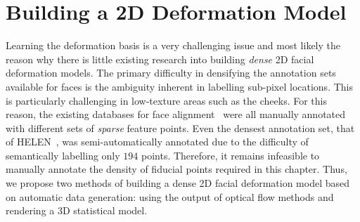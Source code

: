 \section{Building a 2D Deformation Model}\label{sec:face_flow_learning_deformation}
Learning the deformation basis is a very challenging issue and most likely the reason
why there is little existing research into building \textit{dense} 2D facial deformation models.
The primary difficulty in densifying the annotation sets available for faces
is the ambiguity inherent in labelling sub-pixel locations. This is particularly
challenging in low-texture areas such as the cheeks. For this reason, the 
existing databases for face alignment~\cite{sagonas2013300,zhu2012face,%
belhumeur2013localizing,le2012interactive} were all manually annotated with
different sets of \textit{sparse} feature points. 
Even the densest annotation set, that of HELEN~\cite{le2012interactive}, 
was semi-automatically annotated due to the difficulty of semantically
labelling only $194$ points. Therefore, it remains infeasible to manually
annotate the density of fiducial points required in this chapter. Thus, we
propose two methods of building a dense 2D facial deformation model based
on automatic data generation: using the output of optical flow methods and
rendering a 3D statistical model.

